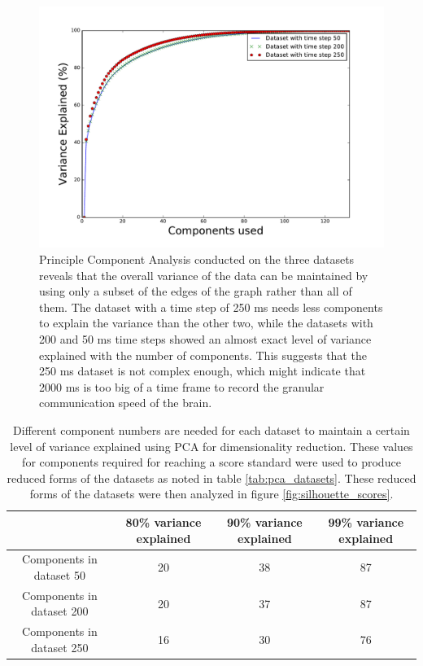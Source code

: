 \documentclass[journal,12pt,onecolumn,draftclsnofoot]{IEEEtran}  %
\begin{document}
\begin{figure}[H]
  \centering
  \includegraphics[width=0.55\linewidth]{figures/variance_explained_with_pca.pdf}
  \caption{Principle Component Analysis conducted on the three datasets reveals that the overall variance of the data can be maintained by using only a subset of the edges of the graph rather than all of them. The dataset with a time step of 250 ms needs less components to explain the variance than the other two, while the datasets with 200 and 50 ms time steps showed an almost exact level of variance explained with the number of components. This suggests that the 250 ms dataset is not complex enough, which might indicate that 2000 ms is too big of a time frame to record the granular communication speed of the brain.}
  \label{fig:pca_analysis_variance}
\end{figure}

\begin{table}[H]
\centering
\caption{Different component numbers are needed for each dataset to maintain a certain level of variance explained using PCA for dimensionality reduction. These values for components required for reaching a score standard were used to produce reduced forms of the datasets as noted in table \ref{tab:pca_datasets}. These reduced forms of the datasets were then analyzed in figure \ref{fig:silhouette_scores}.}
\label{tab:components_needed_for_variance}
\begin{tabular}{|c|c|c|c|}
\hline
 &  80\% variance explained &  90\% variance explained & 99\% variance explained \\ \hline
 
 Components in dataset 50 & 20 &  38&  87  \\ \hline
 Components in dataset 200 & 20 &  37&  87\\ \hline
 Components in dataset 250 & 16 &  30&  76  \\ \hline
\end{tabular}
\end{table}
\end{document}
